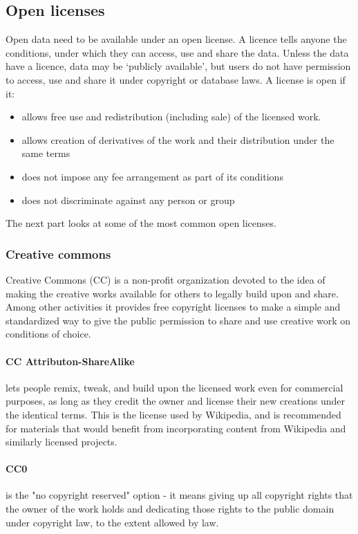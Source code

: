 \documentclass[thesis=B,english]{FITthesis}[2012/06/26]
\begin{document}
	\subsection{Open licenses}
	\label{licenses}
	Open data need to be available under an open license. A licence tells anyone the conditions, under which they can access, use and share the data. Unless the data have a licence, data may be ‘publicly available’, but users do not have permission to access, use and share it under copyright or database laws. A license is open if it:
	\begin{itemize}
		\item allows free use and redistribution (including sale) of the licensed work.
		\item allows creation of derivatives of the work and their distribution under the same terms
		\item does not impose any fee arrangement as part of its conditions
		\item does not discriminate against any person or group
	\end{itemize} 
	The next part looks at some of the most common open licenses. 
	\subsubsection{Creative commons}
	Creative Commons (CC) is a non-profit organization devoted to the idea of making the creative works available for others to legally build upon and share. Among other activities it provides free copyright licenses to make a simple and standardized way to give the public permission to share and use creative work on conditions of choice. \cite{creativecommons}
	\paragraph{CC Attributon-ShareAlike}
	lets people remix, tweak, and build upon the licensed work even for commercial purposes, as long as they credit the owner and license their new creations under the identical terms. This is the license used by Wikipedia, and is recommended for materials that would benefit from incorporating content from Wikipedia and similarly licensed projects.
	\paragraph{CC0}
	is the "no copyright reserved" option - it means giving up all copyright rights that the owner of the work holds and dedicating those rights to the public domain under copyright law, to the extent allowed by law.
\end{document}
